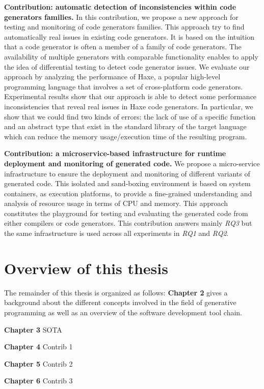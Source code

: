 \textbf{Contribution: automatic detection of inconsistencies within code generators families.}
In this contribution, we propose a new approach for testing and monitoring of code generators families. This approach try to find automatically real issues in existing code generators. 
It is based on the intuition that a code generator is often a member of a family of code generators. The availability of multiple generators with comparable functionality enables to apply the idea of differential testing\cite{mckeeman1998differential} to detect code generator issues.
We evaluate our approach by analyzing the performance of Haxe, a popular high-level programming language that involves a set of cross-platform code generators. Experimental results show that our approach is able to detect some performance inconsistencies that reveal real issues in Haxe code generators.
In particular, we show that we could find two kinds of errors: the lack of use of a specific function and an abstract type that exist in the standard library of the target language which can reduce the memory usage/execution time of the resulting program.

\textbf{Contribution: a microservice-based infrastructure for runtime deployment and monitoring of generated code.}
We propose a micro-service infrastructure to ensure the deployment and monitoring of different variants of generated code. This isolated and sand-boxing environment is based on system containers, as execution platforms, to provide a fine-grained understanding and analysis of resource usage in terms of CPU and memory. This approach constitutes the playground for testing and evaluating the generated code from either compilers or code generators. This contribution answers mainly \textit{RQ3} but the same infrastructure is used across all experiments in \textit{RQ1} and \textit{RQ2}.

\section{Overview of this thesis}
The remainder of this thesis is organized  as follows:
\textbf{Chapter 2} gives a background about the different concepts involved in the field of generative programming as well as an overview of the software development tool chain. 

\textbf{Chapter 3} SOTA

\textbf{Chapter 4} Contrib 1

\textbf{Chapter 5} Contrib 2

\textbf{Chapter 6} Contrib 3  

